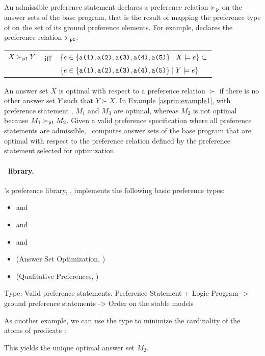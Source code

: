 An admissible preference statement  declares a preference relation $\succ_{\texttt{p}}$ on the answer sets of the base program, 
that is the result of mapping the preference type of  on the set of its ground preference elements.
For example,  declares the preference relation $\succ_{\texttt{p1}}$:
\begin{tabular}{ccl}
$X \succ_{\texttt{p1}} Y$ & iff & $\{e\in \{\texttt{a(1)},\texttt{a(2)},\texttt{a(3)},\texttt{a(4)},\texttt{a(5)}\} \mid X\models e\}\subset$ \\ 
                       &      & $\{e\in \{\texttt{a(1)},\texttt{a(2)},\texttt{a(3)},\texttt{a(4)},\texttt{a(5)}\} \mid Y\models e\}$
\end{tabular}

An answer set $X$ is optimal with respect to a preference relation $\succ$
if there is no other answer set $Y$ such that $Y \succ X$.
In Example \ref{asprin:example1}, with preference statement ,
$M_1$ and $M_3$ are optimal,
whereas $M_2$ is not optimal because $M_1 \succ_{\texttt{p1}} M_2$. 
Given a valid preference specification where all preference statements are admissible, 
\asprin\ computes answer sets of the base program
that are optimal with respect to the preference relation 
defined by the preference statement selected for optimization.

\paragraph{\asprin\ library.}
\asprin's preference library, , implements the following basic preference types:
\begin{itemize}
	\item  {} and    
	\item  {} and    
	\item  {} and    
	\item  {}   (Answer Set Optimization, \cite{brnitr03a})   
	\item  {} (Qualitative Preferences, \cite{rogima10a})  
\end{itemize}

Type: 
Valid preference statements.
Preference Statement + Logic Program -> ground preference statements -> Order on the stable models



As another example, 
we can use the type  to minimize the cardinality of the atoms of predicate : 
%

This yields the unique optimal answer set $M_2$.

